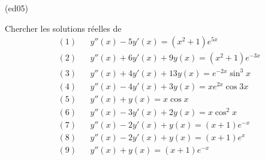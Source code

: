 \begin{tiny}(ed05)\end{tiny}
Chercher les solutions r{\'e}elles de
\begin{align*}
&(1)& &y''(x)-5y'(x) = (x^{2}+1)e^{5x} \\
&(2)& &y''(x)+6y'(x)+9y(x) = (x^{2}+1)e^{-3x} \\
&(3)& &y''(x)+4y'(x)+13y(x) = e^{-2x}\sin ^{3}x \\
&(4)& &y''(x)-4y'(x)+3y(x) = xe^{2x}\cos 3x\\
&(5)& &y''(x)+y(x) = x\cos x \\
&(6)& &y''(x)-3y'(x)+2y(x) = x\cos^2x\\
&(7)& &y''(x)-2y'(x)+ y(x) = (x+1)e^{-x}\\
&(8)& &y''(x)-2y'(x)+ y(x) = (x+1)e^{x}\\
&(9)& &y''(x) + y(x) = (x+1)e^{-x}
\end{align*}
